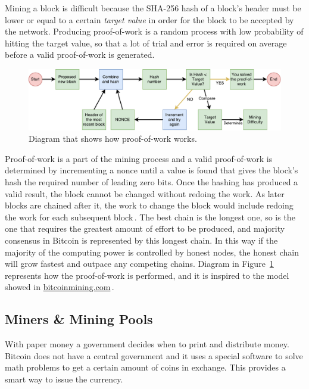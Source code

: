 \documentclass[USenglish]{uit-thesis}
\begin{document}
Mining a block is difficult because the SHA-256 hash of a block's header
must be lower or equal to a certain \emph{target value} in order for the
block to be accepted by the network.
Producing proof-of-work is a random process with low probability
of hitting the target value,
so that a lot of trial and error is required on average before a valid
proof-of-work is generated.

\begin{figure}[h]
	\centering
	\includegraphics[width=1\textwidth]{img/proof-of-work-schema}
	\caption{Diagram that shows how proof-of-work works.}
	\label{fig:proof-of-work-schema}
\end{figure}

Proof-of-work is a part of the mining process and a valid
proof-of-work is determined by incrementing
a nonce until a value is found that gives the block's
hash the required number of leading zero bits.
Once the hashing has produced a
valid result, the block cannot be changed without
redoing the work. As later blocks are
chained after it, the work to change the block would include redoing the work for
each subsequent block\,\cite{bitcoinmining_process}.
The best chain is the longest one, so is the one that requires the greatest
amount of effort to be produced, and majority consensus in Bitcoin
is represented by this longest chain. In this way if the
majority of the computing power is controlled by honest nodes, the honest
chain will grow fastest and outpace any competing chains.
Diagram in  Figure~\ref{fig:proof-of-work-schema} represents
how the proof-of-work is performed, and it is inspired to the model showed
in \url{bitcoinmining.com}\,\cite{bitcoinmining}.

\subsection{Miners \& Mining Pools}
\label{sec:miner}
With paper money a government decides when
to print and distribute money. Bitcoin does not
have a central government and
it uses a special software to solve math problems
to get a certain amount of coins in exchange.
This provides a smart way to issue the currency.
\end{document}
